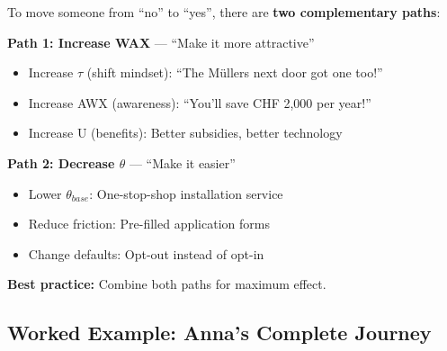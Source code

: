 To move someone from ``no'' to ``yes'', there are \textbf{two complementary paths}:

\begin{center}
\end{center}

\begin{intuition}
\textbf{Path 1: Increase WAX} --- ``Make it more attractive''
\begin{itemize}
\item Increase $\tau$ (shift mindset): ``The Müllers next door got one too!''
\item Increase AWX (awareness): ``You'll save CHF 2,000 per year!''
\item Increase U (benefits): Better subsidies, better technology
\end{itemize}

\textbf{Path 2: Decrease $\theta$} --- ``Make it easier''
\begin{itemize}
\item Lower $\theta_{base}$: One-stop-shop installation service
\item Reduce friction: Pre-filled application forms
\item Change defaults: Opt-out instead of opt-in
\end{itemize}

\textbf{Best practice:} Combine both paths for maximum effect.
\end{intuition}

\subsection{Worked Example: Anna's Complete Journey}

